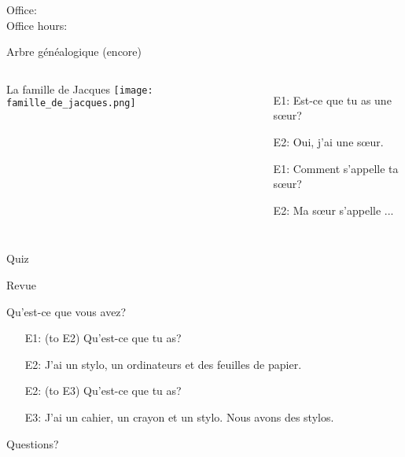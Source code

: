 \documentclass{beamer}
\subtitle[Le verb \lexi{avoir}]{Le verb \lexi{avoir}}
\begin{document}
  \begin{frame}
    \titlepage
    \tiny{Office: \\
          Office hours: }
  \end{frame}

  \begin{frame}{Arbre généalogique (encore) }
    \begin{columns}[t]
        La famille de Jacques
        \texttt{[image: famille\_de\_jacques.png]}
        \begin{itemize}
          \item[E1:] Est-ce que tu as une sœur?
          \item[E2:] Oui, j'ai une sœur.
          \item[E1:] Comment s'appelle ta sœur?
          \item[E2:] Ma sœur s'appelle ...
        \end{itemize}
    \end{columns}
  \end{frame}

  \begin{frame}{}
    \begin{center}
      \Large Quiz
    \end{center}
  \end{frame}

  \begin{frame}{Revue }
    \begin{center}
      
    \end{center}
  \end{frame}

  \begin{frame}{Qu'est-ce que vous avez? }
    \begin{itemize}
      \item[E1:] (to E2) Qu'est-ce que tu as?
      \item[E2:] J'ai un \alert{stylo}, un ordinateurs et des feuilles de papier.
      \item[E2:] (to E3) Qu'est-ce que tu as?
      \item[E3:] J'ai un cahier, un crayon et un \alert{stylo}. Nous avons \alert{des stylos}.
    \end{itemize}
  \end{frame}

  \begin{frame}{}
    \begin{center}
      \Large Questions?
    \end{center}
  \end{frame}
\end{document}
